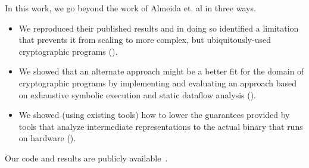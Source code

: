 In this work, we go beyond the work of Almeida et. al in three ways.  
\begin{itemize}
	\item We reproduced their published results and in doing so identified a limitation that prevents it from scaling to more complex, but ubiquitously-used cryptographic programs ().
	\item We showed that an alternate approach might be a better fit for the domain of cryptographic programs by implementing and evaluating an approach based on exhaustive symbolic execution and static dataflow analysis ().
	\item We showed (using existing tools) how to lower the guarantees provided by tools that analyze intermediate representations to the actual binary that runs on hardware ().
\end{itemize}


Our code and results are publicly available~\cite{code-repo}.
